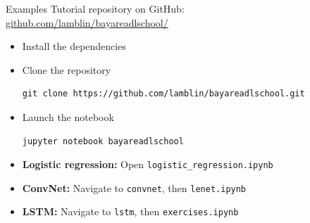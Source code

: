 \documentclass[a4paper,9pt]{beamer}
\begin{document}
\begin{frame}[fragile]{Examples}
  Tutorial repository on GitHub:\\
  \url{github.com/lamblin/bayareadlschool/}

  \begin{itemize}
    \item Install the dependencies
    \item Clone the repository
      \begin{verbatim}
git clone https://github.com/lamblin/bayareadlschool.git
      \end{verbatim}
    \item Launch the notebook
      \begin{verbatim}
jupyter notebook bayareadlschool
      \end{verbatim}
    \item \textbf{Logistic regression:} Open \verb|logistic_regression.ipynb|
    \item \textbf{ConvNet:} Navigate to \verb|convnet|, then \verb|lenet.ipynb|
    \item \textbf{LSTM:} Navigate to \verb|lstm|, then \verb|exercises.ipynb|
  \end{itemize}
\end{frame}
\end{document}

